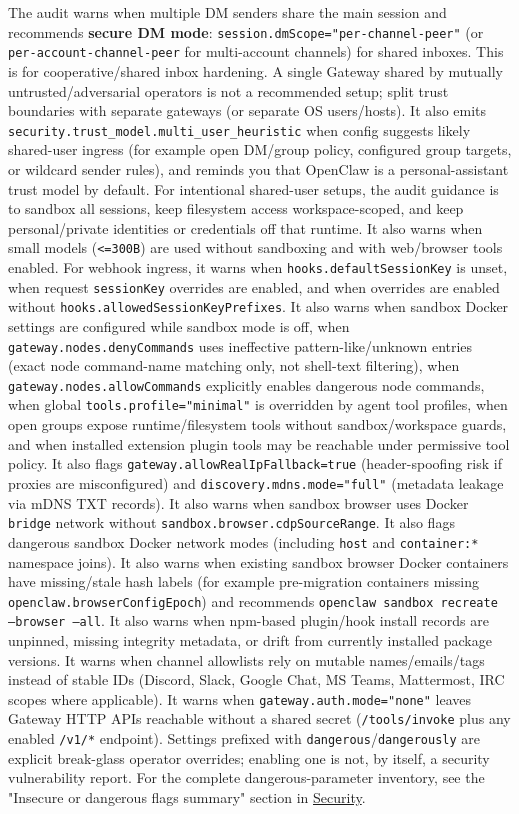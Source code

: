 The audit warns when multiple DM senders share the main session and recommends \textbf{secure DM mode}: \texttt{session.dmScope="per-channel-peer"} (or \texttt{per-account-channel-peer} for multi-account channels) for shared inboxes.
This is for cooperative/shared inbox hardening. A single Gateway shared by mutually untrusted/adversarial operators is not a recommended setup; split trust boundaries with separate gateways (or separate OS users/hosts).
It also emits \texttt{security.trust\_model.multi\_user\_heuristic} when config suggests likely shared-user ingress (for example open DM/group policy, configured group targets, or wildcard sender rules), and reminds you that OpenClaw is a personal-assistant trust model by default.
For intentional shared-user setups, the audit guidance is to sandbox all sessions, keep filesystem access workspace-scoped, and keep personal/private identities or credentials off that runtime.
It also warns when small models (\texttt{<=300B}) are used without sandboxing and with web/browser tools enabled.
For webhook ingress, it warns when \texttt{hooks.defaultSessionKey} is unset, when request \texttt{sessionKey} overrides are enabled, and when overrides are enabled without \texttt{hooks.allowedSessionKeyPrefixes}.
It also warns when sandbox Docker settings are configured while sandbox mode is off, when \texttt{gateway.nodes.denyCommands} uses ineffective pattern-like/unknown entries (exact node command-name matching only, not shell-text filtering), when \texttt{gateway.nodes.allowCommands} explicitly enables dangerous node commands, when global \texttt{tools.profile="minimal"} is overridden by agent tool profiles, when open groups expose runtime/filesystem tools without sandbox/workspace guards, and when installed extension plugin tools may be reachable under permissive tool policy.
It also flags \texttt{gateway.allowRealIpFallback=true} (header-spoofing risk if proxies are misconfigured) and \texttt{discovery.mdns.mode="full"} (metadata leakage via mDNS TXT records).
It also warns when sandbox browser uses Docker \texttt{bridge} network without \texttt{sandbox.browser.cdpSourceRange}.
It also flags dangerous sandbox Docker network modes (including \texttt{host} and \texttt{container:*} namespace joins).
It also warns when existing sandbox browser Docker containers have missing/stale hash labels (for example pre-migration containers missing \texttt{openclaw.browserConfigEpoch}) and recommends \texttt{openclaw sandbox recreate --browser --all}.
It also warns when npm-based plugin/hook install records are unpinned, missing integrity metadata, or drift from currently installed package versions.
It warns when channel allowlists rely on mutable names/emails/tags instead of stable IDs (Discord, Slack, Google Chat, MS Teams, Mattermost, IRC scopes where applicable).
It warns when \texttt{gateway.auth.mode="none"} leaves Gateway HTTP APIs reachable without a shared secret (\texttt{/tools/invoke} plus any enabled \texttt{/v1/*} endpoint).
Settings prefixed with \texttt{dangerous}/\texttt{dangerously} are explicit break-glass operator overrides; enabling one is not, by itself, a security vulnerability report.
For the complete dangerous-parameter inventory, see the "Insecure or dangerous flags summary" section in \href{/gateway/security}{Security}.


